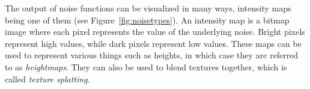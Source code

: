 The output of noise functions can be visualized in many ways, intensity maps being one of them (see Figure~\ref{fig:noisetypes}).
An intensity map is a bitmap image where each pixel represents the value of the underlying noise.
Bright pixels represent high values, while dark pixels represent low values.
These maps can be used to represent various things such as heights, in which case they are referred to as \textit{heightmaps}.
They can also be used to blend textures together, which is called \textit{texture splatting}.